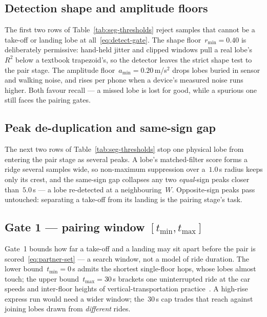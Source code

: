\documentclass[manuscript,review,screen]{acmart}
\begin{document}
\subsection{Detection shape and amplitude floors}
\label{app:seg-detect-floors}

The first two rows of Table~\ref{tab:seg-thresholds} reject samples
that cannot be a take-off or
landing lobe at all~\eqref{eq:detect-gate}.  The shape
floor~$r_{\min}\!=\!0.40$ is deliberately permissive: hand-held
jitter and clipped windows pull a real lobe's~$R^{2}$ below a
textbook trapezoid's, so the detector leaves the strict shape test to
the pair stage.  The amplitude floor~$a_{\min}\!=\!0.20$\,m/s$^{2}$
drops lobes buried in sensor and walking noise, and rises per phone
when a device's measured noise runs higher.  Both favour recall ---
a missed lobe is lost for good, while a spurious one still faces the
pairing gates.

\subsection{Peak de-duplication and same-sign gap}
\label{app:seg-detect-dedup}

The next two rows of Table~\ref{tab:seg-thresholds} stop one physical
lobe from entering the pair stage
as several peaks.  A lobe's matched-filter score forms a ridge
several samples wide, so non-maximum suppression over a~$1.0$\,s
radius keeps only its crest, and the same-sign gap collapses any two
\emph{equal}-sign peaks closer than~$5.0$\,s --- a lobe re-detected
at a neighbouring~$W$.  Opposite-sign peaks pass untouched:
separating a take-off from its landing is the pairing stage's task.

\subsection{Gate 1 --- pairing window $[t_{\min},t_{\max}]$}
\label{app:seg-gate1}

Gate~1 bounds how far a take-off and a landing may sit apart before
the pair is scored~\eqref{eq:partner-set} --- a search window, not a
model of ride duration.  The lower bound~$t_{\min}\!=\!0$\,s admits
the shortest single-floor hops, whose lobes almost touch; the upper
bound~$t_{\max}\!=\!30$\,s brackets one uninterrupted ride at the car
speeds and inter-floor heights of vertical-transportation
practice~\cite{strakosch2010,cibseguidd2020}.  A high-rise express
run would need a wider window; the~$30$\,s cap trades that reach
against joining lobes drawn from \emph{different} rides.
\end{document}
